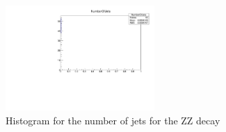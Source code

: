 \documentclass[runningheads,a4paper]{llncs}
\begin{document}
\begin{figure}
\centering
\includegraphics[height=4cm]{NumberOfJets_ZZ}
\caption{Histogram for the number of jets for the ZZ decay}
\label{fig:nojzz}
\end{figure}

%
%
%
%
%
%
\end{document}
